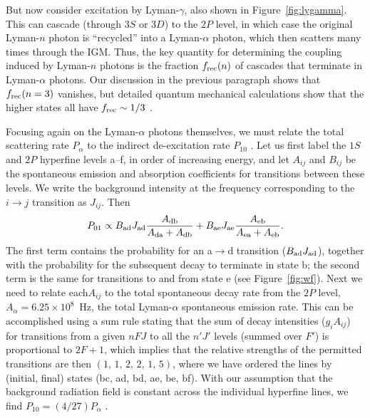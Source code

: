 \documentclass[a4paper,openany, 12pt]{book}
\begin{document}
But now consider excitation by Lyman-$\gamma$, also shown in Figure~\ref{fig:lygamma}.  This can cascade (through $3S$ or $3D$) to the $2P$ level, in which case the original Lyman-$n$ photon is ``recycled'' into a Lyman-$\alpha$ photon, which then scatters many times through the IGM.  Thus, the key quantity for determining the coupling induced by Lyman-$n$ photons is the fraction $f_{\rm rec}(n)$ of cascades that terminate in Lyman-$\alpha$ photons.  Our discussion in the previous paragraph shows that $f_{\rm rec}(n=3)$ vanishes, but detailed quantum mechanical calculations show that the higher states all have $f_{\rm rec} \sim 1/3$ \cite{hirata06, pritchard06}. 

Focusing again on the Lyman-$\alpha$ photons themselves, we must relate the total scattering rate $P_\alpha$ to the indirect de-excitation rate $P_{10}$ \cite{field58, meiksin00}. Let us first label the $1S$ and $2P$ hyperfine levels a--f, in order of increasing energy, and let $A_{ij}$ and $B_{ij}$ be the spontaneous emission and absorption coefficients for transitions between these levels.  We write the background intensity at the frequency corresponding to the $i \rightarrow j$ transition as $J_{ij}$.  Then
\begin{equation}
P_{01} \propto B_{\rm ad} J_{\rm ad} \frac{A_{\rm db}}{A_{\rm da} + A_{\rm db}} + B_{\rm ae} J_{\rm ae} \frac{A_{\rm eb}}{A_{\rm ea} + A_{\rm eb}}.\label{eq:psum}
\end{equation}
The first term contains the probability for an a$\rightarrow$d transition ($B_{\rm ad} J_{\rm ad}$), together with the probability for the subsequent decay to terminate in state b; the second term is the same for transitions to and from state e (see Figure~\ref{fig:wf}).  Next we need to relate each$A_{ij}$ to the total spontaneous decay rate from the $2P$ level, $A_\alpha = 6.25 \times 10^8$~Hz, the total Lyman-$\alpha$ spontaneous emission rate.  This can be accomplished using a sum rule stating that the sum of decay intensities ($g_i A_{ij}$) for transitions from a
given $nFJ$ to all the $n' J'$ levels (summed over $F'$) is proportional to $2F+1$, which implies that the relative strengths of the permitted transitions are then $(1,\,1,\,2,\,2,\,1,\,5)$, where we have ordered the lines by (initial, final) states (bc, ad, bd, ae, be, bf).  With our assumption that the background radiation field is constant across the individual hyperfine lines, we find $P_{10} = (4/27) P_\alpha$ \cite{meiksin00}.
\end{document}
